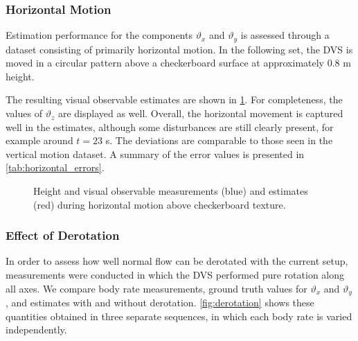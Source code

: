 \begin{table}[!ht]
	\centering
	\caption{Parameters of the quadratic fit models in \cref{fig:divergence_error_dist}.}
	
	\label{tab:div_error_parameters}
\end{table}

\subsubsection{Horizontal Motion}
Estimation performance for the components $\vartheta_x$ and $\vartheta_y$ is assessed through a dataset consisting of primarily horizontal motion. In the following set, the DVS is moved in a circular pattern above a checkerboard surface at approximately 0.8 m height.

The resulting visual observable estimates are shown in \cref{fig:horizontal_motion}. For completeness, the values of $\vartheta_z$ are displayed as well. Overall, the horizontal movement is captured well in the estimates, although some disturbances are still clearly present, for example around $t=23$ s. The deviations are comparable to those seen in the vertical motion dataset. A summary of the error values is presented in \cref{tab:horizontal_errors}.

\begin{figure}[!ht]
	\centering
	\setlength{\fwidth}{0.4\linewidth}
	
	\caption{Height and visual observable measurements (blue) and estimates (red) during horizontal motion above checkerboard texture.}
	\label{fig:horizontal_motion}
\end{figure}

\begin{table}[!ht]
	\centering
	\caption{Mean and standard deviation of absolute errors for the estimates during horizontal motion, shown in \cref{fig:horizontal_motion}.}
	
	\label{tab:horizontal_errors}
\end{table}


\subsubsection{Effect of Derotation}
In order to assess how well normal flow can be derotated with the current setup, measurements were conducted in which the DVS performed pure rotation along all axes. We compare body rate measurements, ground truth values for $\vartheta_x$ and $\vartheta_y$, and estimates with and without derotation. \cref{fig:derotation} shows these quantities obtained in three separate sequences, in which each body rate is varied independently. 

